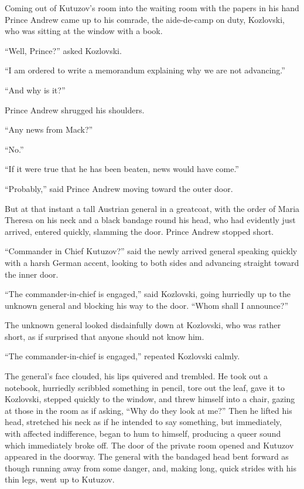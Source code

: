 Coming out of Kutuzov's room into the waiting room with the
papers in his hand Prince Andrew came up to his comrade, the
aide-de-camp on duty, Kozlovski, who was sitting at the window
with a book.

``Well, Prince?'' asked Kozlovski.

``I am ordered to write a memorandum explaining why we are not
advancing.''

``And why is it?''

Prince Andrew shrugged his shoulders.

``Any news from Mack?''

``No.''

``If it were true that he has been beaten, news would have
come.''

``Probably,'' said Prince Andrew moving toward the outer door.

But at that instant a tall Austrian general in a greatcoat, with
the order of Maria Theresa on his neck and a black bandage round
his head, who had evidently just arrived, entered quickly,
slamming the door.  Prince Andrew stopped short.

``Commander in Chief Kutuzov?'' said the newly arrived general
speaking quickly with a harsh German accent, looking to both
sides and advancing straight toward the inner door.

``The commander-in-chief is engaged,'' said Kozlovski, going
hurriedly up to the unknown general and blocking his way to the
door. ``Whom shall I announce?''

The unknown general looked disdainfully down at Kozlovski, who
was rather short, as if surprised that anyone should not know
him.

``The commander-in-chief is engaged,'' repeated Kozlovski calmly.

The general's face clouded, his lips quivered and trembled. He
took out a notebook, hurriedly scribbled something in pencil,
tore out the leaf, gave it to Kozlovski, stepped quickly to the
window, and threw himself into a chair, gazing at those in the
room as if asking, ``Why do they look at me?'' Then he lifted his
head, stretched his neck as if he intended to say something, but
immediately, with affected indifference, began to hum to himself,
producing a queer sound which immediately broke off. The door of
the private room opened and Kutuzov appeared in the doorway. The
general with the bandaged head bent forward as though running
away from some danger, and, making long, quick strides with his
thin legs, went up to Kutuzov.

